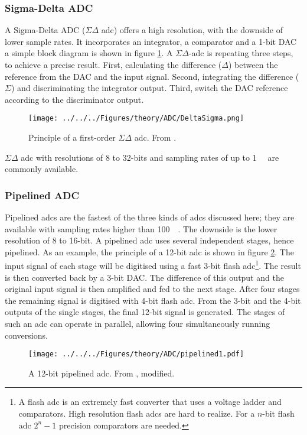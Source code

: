 \subsubsection{Sigma-Delta ADC}
A Sigma-Delta ADC ($\Sigma\Delta$ \ac{adc}) offers a high resolution, with the downside of lower sample rates. It incorporates an integrator, a comparator and a 1-bit \ac{DAC} a simple block diagram is shown in figure \ref{fig:theory:SigmaDelta}. A $\Sigma\Delta$-\ac{adc} is repeating three steps, to achieve a precise result. First, calculating the difference ($\Delta$) between the reference from the \ac{DAC} and the input signal. Second, integrating the difference ($\Sigma$) and discriminating the integrator output. Third, switch the \ac{DAC} reference according to the discriminator output. 
\begin{figure}
	\centering
	\texttt{[image: ../../../Figures/theory/ADC/DeltaSigma.png]}
	\caption{Principle of a first-order $\Sigma\Delta$ \ac{adc}. From \cite{wikiSigmaDelta}.}
	\label{fig:theory:SigmaDelta}
\end{figure} 
 $\Sigma\Delta$ \ac{adc} with resolutions of 8 to 32-bits and sampling rates of up to \SI{1}{\mega\sps} are commonly available.
\subsubsection{Pipelined ADC}
Pipelined \acp{adc} are the fastest of the three kinds of \acp{adc} discussed here; they are available with sampling rates higher than \SI{100}{\mega\sps}. The downside is the lower resolution of 8 to 16-bit.
A pipelined \ac{adc} uses several independent stages, hence pipelined. As an example, the principle of a 12-bit \ac{adc} is shown in figure \ref{fig:theory:pipelined}. The input signal of each stage will be digitised using a fast 3-bit flash \ac{adc}\footnote{A flash \ac{adc} is an extremely fast converter that uses a voltage ladder and comparators. High resolution flash \acp{adc} are hard to realize. For a $n$-bit flash \ac{adc} $2^n-1$ precision comparators are needed.}. The result is then converted back by a 3-bit \ac{DAC}. The difference of this output and the original input signal is then amplified and fed to the next stage. After four stages the remaining signal is digitised with 4-bit flash \ac{adc}. From the 3-bit and the 4-bit outputs of the single stages, the final 12-bit signal is generated.
The stages of such an \ac{adc} can operate in parallel, allowing four simultaneously running conversions.
\begin{figure}
	\centering
	\texttt{[image: ../../../Figures/theory/ADC/pipelined1.pdf]}
	\caption{A 12-bit pipelined \ac{adc}. From \cite{pipelined}, modified.}
	\label{fig:theory:pipelined}
\end{figure}
